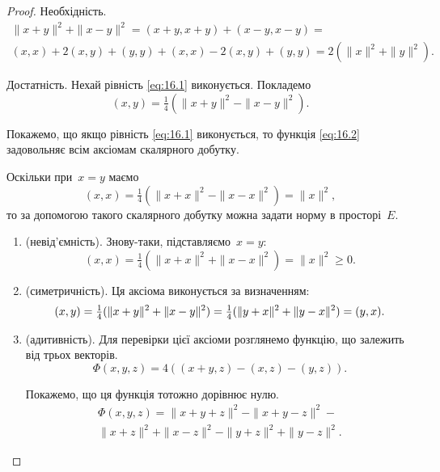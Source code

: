 \begin{proof}
Необхідність.
\begin{multline*}
    \|x + y\|^2 + \|x - y\|^2 =
    (x + y, x + y) + (x - y, x - y) = \\
    (x, x) + 2 (x, y) + (y, y) + (x, x) - 2 (x, y) + (y, y) =
    2 (\|x\|^2 + \|y\|^2).
\end{multline*}

Достатність. Нехай рівність \eqref{eq:16.1} виконується. Покладемо
\begin{equation}
    \label{eq:16.2}
    (x, y) = \tfrac{1}{4} ( \|x + y\|^2 - \|x - y\|^2).
\end{equation}

Покажемо, що якщо рівність \eqref{eq:16.1} виконується, то функція \eqref{eq:16.2}
задовольняє всім аксіомам скалярного добутку.

Оскільки при~$x = y$ маємо
\begin{equation*}
    (x, x) = \tfrac{1}{4} ( \|x + x\|^2 - \|x - x\|^2) = \|x\|^2,
\end{equation*}
то за допомогою такого скалярного добутку можна задати
норму в просторі~$E$.

\begin{enumerate}
\item (невід’ємність). Знову-таки, підставляємо~$x = y$:
\begin{equation*}
    (x, x) = \tfrac{1}{4} (\|x + x\|^2 + \|x - x\|^2) = \|x\|^2 \ge 0.
\end{equation*}

\item (симетричність). Ця аксіома виконується за визначенням:
\begin{equation*}
    (x, y) = \tfrac{1}{4} (\|x + y\|^2 + \|x - y\|^2) = \\
    \tfrac{1}{4} (\|y + x\|^2 + \|y - x\|^2) = (y, x).
\end{equation*}

\item (адитивність). Для перевірки цієї аксіоми
розглянемо функцію, що залежить від трьох векторів.
\begin{equation*}
\Phi(x, y, z) = 4 ((x + y, z) - (x, z) - (y, z)).
\end{equation*}

Покажемо, що ця функція тотожно дорівнює нулю.
\begin{multline}
    \label{eq:16.3}
    \Phi(x, y, z) = \|x + y + z\|^2 - \|x + y - z\|^2 - \\
    \|x + z\|^2 + \|x - z\|^2 - \|y + z\|^2 + \|y - z\|^2.
\end{multline}


\end{enumerate}
\end{proof}
